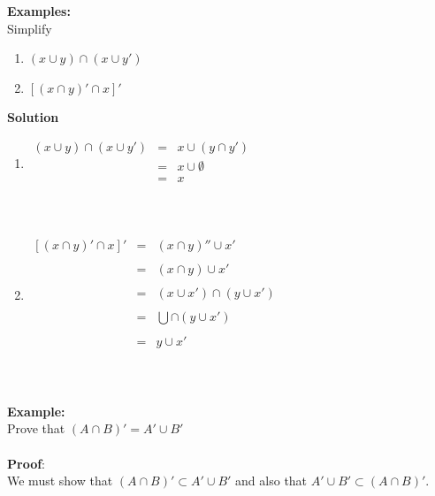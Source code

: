 \documentclass[11pt,a4paper]{article}
\begin{document}
\textbf{Examples:}\\ Simplify
\begin{enumerate}
\item $(x\cup y)\cap (x\cup y')$
\item $[(x\cap y)'\cap x]'$\\
\end{enumerate}



\textbf{Solution}
\begin{enumerate}
\item[] \hspace{0.2cm}
$
\begin{matrix}
(x\cup y)\cap (x\cup y') & = & x\cup (y\cap y')\\
                         & = & x \cup \emptyset\\
                         & =& x\\
\end{matrix}
$\\\\\\

\item[]
$
\begin{matrix}
[(x\cap y)'\cap x]' & = & (x\cap y)'' \cup x'\\\\
                    & = & (x\cap y) \cup x'\\\\
                    & = & (x\cup x')\cap (y\cup x')\\\\
                    & = & \bigcup \cap (y\cup x')\\\\
                    & = & y\cup x'\\
\end{matrix}
$\\\\\\
\end{enumerate}


\textbf{Example:}\\
Prove that $(A\cap B)' =A'\cup B'$\\\\

\textbf{Proof}:\\
We must show that $(A\cap B)'\subset A'\cup B'$ and also that $A'\cup B'\subset (A\cap B)'$.\\
\end{document}
